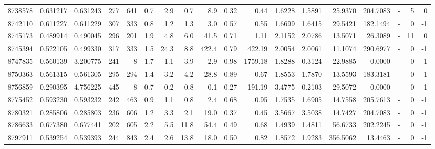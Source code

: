 \begin{tabular}{rrrrrrrrrrrrrrrlrr}
   8738578 & 0.631217 &   0.631243 &  277 &  641 &      0.7 &      2.9 &     0.7 &      8.9 &       0.32 &        0.44 &  1.6228 &  1.5891 &   25.9370 &  204.7083 &             - &        5 &          0 \\
   8742110 & 0.611227 &   0.611229 &  307 &  333 &      0.8 &      1.2 &     1.3 &      3.0 &       0.57 &        0.55 &  1.6699 &  1.6415 &   29.5421 &  182.1494 &             - &        0 &         -1 \\
   8745173 & 0.489914 &   0.490045 &  296 &  201 &      1.9 &      4.8 &     6.0 &     41.5 &       0.71 &        1.11 &  2.1152 &  2.0786 &   13.5071 &   26.3089 &             - &       11 &          0 \\
   8745394 & 0.522105 &   0.499330 &  317 &  333 &      1.5 &     24.3 &     8.8 &    422.4 &       0.79 &      422.19 &  2.0054 &  2.0061 &   11.1074 &  290.6977 &             - &        0 &         -1 \\
   8747835 & 0.560139 &   3.200775 &  241 &    8 &      1.7 &      1.1 &     3.9 &      2.9 &       0.98 &     1759.18 &  1.8288 &  0.3124 &   22.9885 &    0.0000 &             - &        0 &         -1 \\
   8750363 & 0.561315 &   0.561305 &  295 &  294 &      1.4 &      3.2 &     4.2 &     28.8 &       0.89 &        0.67 &  1.8553 &  1.7870 &   13.5593 &  183.3181 &             - &        0 &         -1 \\
   8756859 & 0.290395 &   4.756225 &  445 &    8 &      0.7 &      0.2 &     0.8 &      0.1 &       0.27 &      191.19 &  3.4775 &  0.2103 &   29.5072 &    0.0000 &             - &        0 &         -1 \\
   8775452 & 0.593230 &   0.593232 &  242 &  463 &      0.9 &      1.1 &     0.8 &      2.4 &       0.68 &        0.95 &  1.7535 &  1.6905 &   14.7558 &  205.7613 &             - &        0 &         -1 \\
   8780321 & 0.285806 &   0.285803 &  236 &  606 &      1.2 &      3.3 &     2.1 &     19.0 &       0.37 &        0.45 &  3.5667 &  3.5038 &   14.7427 &  204.7083 &             - &        0 &         -1 \\
   8786633 & 0.677380 &   0.677441 &  202 &  605 &      2.2 &      5.5 &    11.8 &     54.4 &       0.49 &        0.68 &  1.4939 &  1.4811 &   56.6733 &  202.2245 &             - &        0 &         -1 \\
   8797911 & 0.539254 &   0.539393 &  244 &  843 &      2.4 &      2.6 &    13.8 &     18.0 &       0.50 &        0.82 &  1.8572 &  1.9283 &  356.5062 &   13.4463 &             - &        0 &         -1 \\

\end{tabular}
